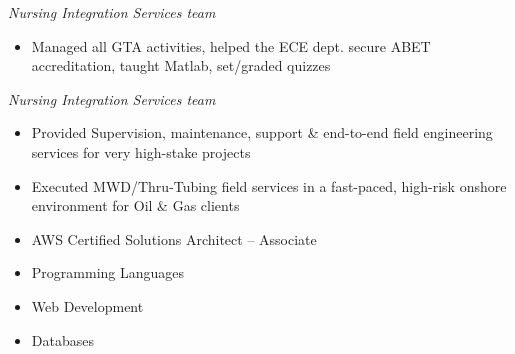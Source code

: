 \documentclass[10pt,a4paper,ragged2e,withhyper]{altacv}
\begin{document}
\begin{paracol}{2}
\divider

\emph{Nursing Integration Services team}
\begin{itemize}
\item Managed all GTA activities, helped the ECE dept. secure ABET accreditation, taught Matlab, set/graded quizzes
\end{itemize}

\divider

\emph{Nursing Integration Services team}
\begin{itemize}
\item Provided Supervision, maintenance, support \& end-to-end field engineering services for very high-stake projects
\item Executed MWD/Thru-Tubing field services in a fast-paced, high-risk onshore environment for Oil \& Gas clients
\end{itemize}



\newpage

\switchcolumn

\begin{itemize}
\item AWS Certified Solutions Architect – Associate                           
\end{itemize}



\begin{itemize}
\item \textcolor{emphasis}{Programming Languages} 
\end{itemize}

\vskip 0.2cm

\begin{itemize}
\item \textcolor{emphasis}{Web Development} 
\end{itemize}

\vskip 0.2cm

\begin{itemize}
\item \textcolor{emphasis}{Databases} 
\end{itemize}


\end{paracol}
\end{document}
